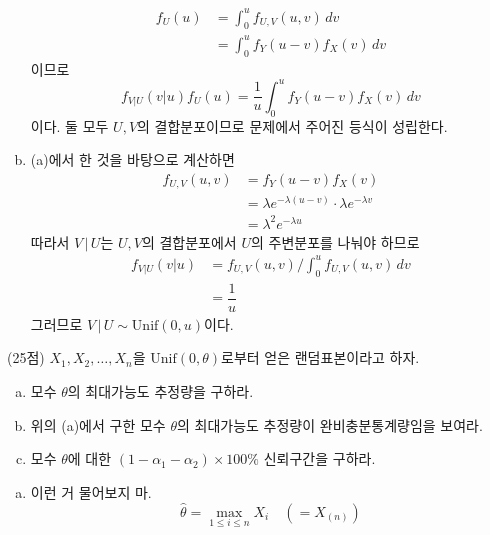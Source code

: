 \documentclass[answers]{exam}
\begin{document}
\begin{questions}
\begin{solution}
\begin{enumerate}[(a)]
\begin{align}
        f_{U}\left(u\right) &= \int_{0}^{u}f_{U,V}\left(u,v\right)\,dv\\
        &= \int_{0}^{u}f_{Y}\left(u-v\right)f_{X}\left(v\right)\,dv
        \end{align}
        이므로
        \begin{equation}
          f_{V|U}\left(v|u\right)f_{U}\left(u\right)= \dfrac{1}{u}\int_{0}^{u}f_{Y}\left(u-v\right)f_{X}\left(v\right)\,dv
        \end{equation}
        이다. 둘 모두 $U,V$의 결합분포이므로 문제에서 주어진 등식이 성립한다.
        \item (a)에서 한 것을 바탕으로 계산하면
        \begin{align}
          f_{U,V}\left(u,v\right) &= f_{Y}\left(u-v\right)f_{X}\left(v\right)\\
          &= \lambda e^{-\lambda\left(u-v\right)}\cdot \lambda e^{-\lambda v}\\
          &=\lambda^{2}e^{-\lambda u}
        \end{align}
        따라서 $V\,|\,U$는 $U,V$의 결합분포에서 $U$의 주변분포를 나눠야 하므로
        \begin{align}
          f_{V|U}\left(v|u\right) &= f_{U,V}\left(u,v\right)\Big/\int_{0}^{u}f_{U,V}\left(u,v\right) \,dv\\
          &=\dfrac{1}{u}
        \end{align}
        그러므로 $V\,|\,U\sim \mathrm{Unif}\left(0,u\right)$이다.
      \end{enumerate}
    \end{solution}
    \question
    (25점) $X_{1},X_{2},\ldots,X_{n}$을 $\mathrm{Unif}\left(0,\theta\right)$로부터 얻은 랜덤표본이라고 하자.
    \begin{enumerate}[(a)]
      \item 모수 $\theta$의 최대가능도 추정량을 구하라.
      \item 위의 (a)에서 구한 모수 $\theta$의 최대가능도 추정량이 완비충분통계량임을 보여라.
      \item 모수 $\theta$에 대한 $\left(1-\alpha_{1}-\alpha_{2}\right)\times 100\%$ 신뢰구간을 구하라.
    \end{enumerate}
    \begin{solution}
      \begin{enumerate}[(a)]
        \item 이런 거 물어보지 마.
        \begin{equation}
          \widehat{\theta}=\max_{1\leq i \leq n}X_{i} \quad \left(=X_{\left(n\right)}\right)

\end{equation}
\end{enumerate}
\end{solution}
\end{questions}
\end{document}
